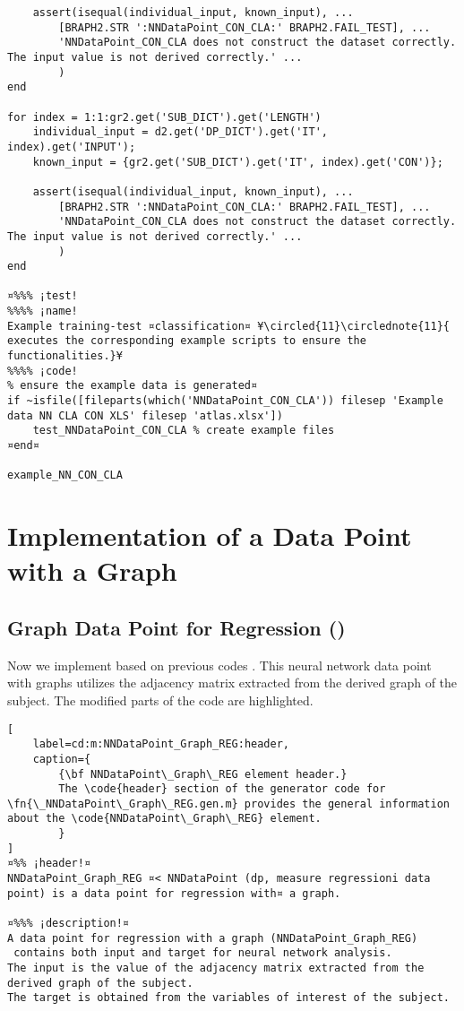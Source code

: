 \documentclass{tufte-handout}
\begin{document}
\begin{lstlisting}
    assert(isequal(individual_input, known_input), ...
        [BRAPH2.STR ':NNDataPoint_CON_CLA:' BRAPH2.FAIL_TEST], ...
        'NNDataPoint_CON_CLA does not construct the dataset correctly. The input value is not derived correctly.' ...
        )
end

for index = 1:1:gr2.get('SUB_DICT').get('LENGTH')
    individual_input = d2.get('DP_DICT').get('IT', index).get('INPUT');
    known_input = {gr2.get('SUB_DICT').get('IT', index).get('CON')};

    assert(isequal(individual_input, known_input), ...
        [BRAPH2.STR ':NNDataPoint_CON_CLA:' BRAPH2.FAIL_TEST], ...
        'NNDataPoint_CON_CLA does not construct the dataset correctly. The input value is not derived correctly.' ...
        )
end

¤%%% ¡test! 
%%%% ¡name!
Example training-test ¤classification¤ ¥\circled{11}\circlednote{11}{ executes the corresponding example scripts to ensure the functionalities.}¥
%%%% ¡code!
% ensure the example data is generated¤
if ~isfile([fileparts(which('NNDataPoint_CON_CLA')) filesep 'Example data NN CLA CON XLS' filesep 'atlas.xlsx'])
    test_NNDataPoint_CON_CLA % create example files
¤end¤

example_NN_CON_CLA

\end{lstlisting}


\clearpage
\section{Implementation of a Data Point with a Graph}
\subsection{Graph Data Point for Regression ()}

Now we implement  based on previous codes .
This neural network data point with graphs utilizes the adjacency matrix extracted from the derived graph of the subject. 
The modified parts of the code are highlighted.

\begin{lstlisting}[
	label=cd:m:NNDataPoint_Graph_REG:header,
	caption={
		{\bf NNDataPoint\_Graph\_REG element header.}
		The \code{header} section of the generator code for \fn{\_NNDataPoint\_Graph\_REG.gen.m} provides the general information about the \code{NNDataPoint\_Graph\_REG} element.
		}
]
¤%% ¡header!¤
NNDataPoint_Graph_REG ¤< NNDataPoint (dp, measure regressioni data point) is a data point for regression with¤ a graph.

¤%%% ¡description!¤
A data point for regression with a graph (NNDataPoint_Graph_REG) 
 contains both input and target for neural network analysis.
The input is the value of the adjacency matrix extracted from the derived graph of the subject.
The target is obtained from the variables of interest of the subject.
\end{lstlisting}
\end{document}
